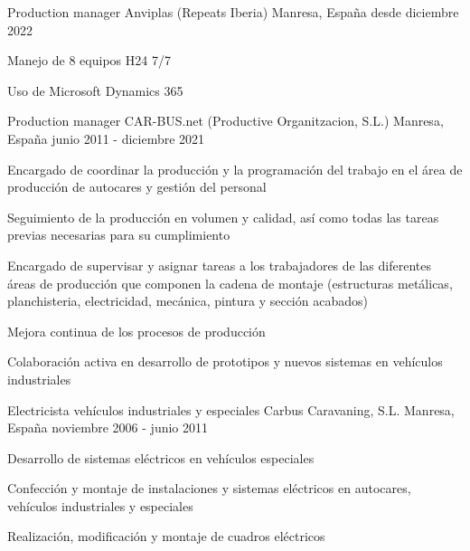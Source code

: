 

\begin{cventries}

  \cventry
  {Production manager} %
  {Anviplas (Repeats Iberia)} %
  {Manresa, España} %
  {desde diciembre 2022} %
  {
    \begin{cvitems} %
      \item {Manejo de 8 equipos H24 7/7}
      \item {Uso de Microsoft Dynamics 365}
    \end{cvitems}
  }

  \cventry
    {Production manager} %
    {CAR-BUS.net (Productive Organitzacion, S.L.)} %
    {Manresa, España} %
    {junio 2011 - diciembre 2021} %
    {
      \begin{cvitems} %
        \item {Encargado de coordinar la producción y la programación del trabajo en el área de producción de autocares y gestión del personal}
        \item {Seguimiento de la producción en volumen y calidad, así como todas las tareas previas necesarias para su cumplimiento}
        \item {Encargado de supervisar y asignar tareas a los trabajadores de las diferentes áreas de producción que componen la cadena de montaje (estructuras metálicas, planchisteria, electricidad, mecánica, pintura y sección acabados)}
        \item {Mejora continua de los procesos de producción}
        \item {Colaboración activa en desarrollo de prototipos y nuevos sistemas en vehículos industriales}
      \end{cvitems}
    }

  \cventry
    {Electricista vehículos industriales y especiales} %
    {Carbus Caravaning, S.L.} %
    {Manresa, España} %
    {noviembre 2006 - junio 2011} %
    {
      \begin{cvitems} %
        \item {Desarrollo de sistemas eléctricos en vehículos especiales}
        \item {Confección y montaje de instalaciones y sistemas eléctricos en autocares, vehículos industriales y especiales}
        \item {Realización, modificación y montaje de cuadros eléctricos}
      \end{cvitems}
    }


\end{cventries}
